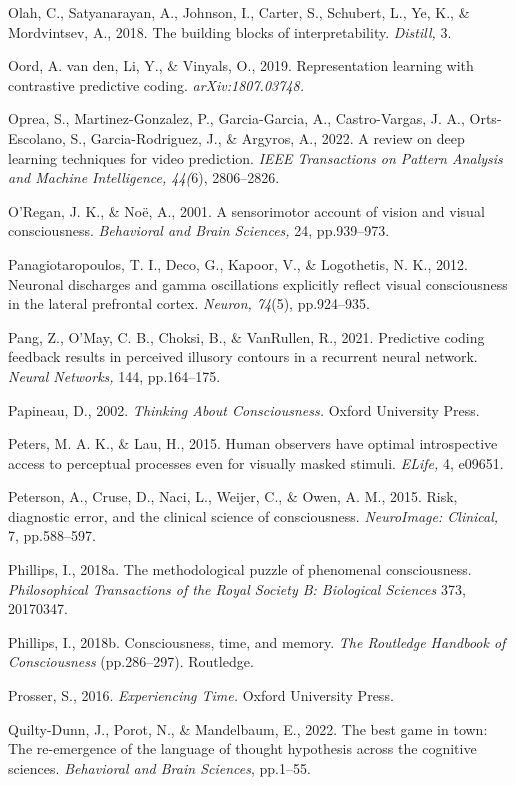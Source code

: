 \documentclass[12pt]{article}
\begin{document}
Olah, C., Satyanarayan, A., Johnson, I., Carter, S., Schubert, L., Ye,
K., \& Mordvintsev, A., 2018. The building blocks of interpretability.
\emph{Distill,} 3.

Oord, A. van den, Li, Y., \& Vinyals, O., 2019. Representation learning
with contrastive predictive coding. \emph{arXiv:1807.03748.}

Oprea, S., Martinez-Gonzalez, P., Garcia-Garcia, A., Castro-Vargas, J.
A., Orts-Escolano, S., Garcia-Rodriguez, J., \& Argyros, A., 2022. A
review on deep learning techniques for video prediction. \emph{IEEE
Transactions on Pattern Analysis and Machine Intelligence, 44(}6),
2806--2826.

O'Regan, J. K., \& Noë, A., 2001. A sensorimotor account of vision and
visual consciousness. \emph{Behavioral and Brain Sciences,} 24,
pp.939--973.

Panagiotaropoulos, T. I., Deco, G., Kapoor, V., \& Logothetis, N. K.,
2012. Neuronal discharges and gamma oscillations explicitly reflect
visual consciousness in the lateral prefrontal cortex. \emph{Neuron,
74}(5), pp.924--935.

Pang, Z., O'May, C. B., Choksi, B., \& VanRullen, R., 2021. Predictive
coding feedback results in perceived illusory contours in a recurrent
neural network. \emph{Neural Networks,} 144, pp.164--175.

Papineau, D., 2002. \emph{Thinking About Consciousness.} Oxford
University Press.

Peters, M. A. K., \& Lau, H., 2015. Human observers have optimal
introspective access to perceptual processes even for visually masked
stimuli. \emph{ELife,} 4, e09651.

Peterson, A., Cruse, D., Naci, L., Weijer, C., \& Owen, A. M., 2015.
Risk, diagnostic error, and the clinical science of consciousness.
\emph{NeuroImage: Clinical,} 7, pp.588--597.

Phillips, I., 2018a. The methodological puzzle of phenomenal
consciousness. \emph{Philosophical Transactions of the Royal Society B:
Biological Sciences} 373, 20170347.

Phillips, I., 2018b. Consciousness, time, and memory. \emph{The
Routledge Handbook of Consciousness} (pp.286--297). Routledge.

Prosser, S., 2016. \emph{Experiencing Time.} Oxford University Press.

Quilty-Dunn, J., Porot, N., \& Mandelbaum, E., 2022. The best game in
town: The re-emergence of the language of thought hypothesis across the
cognitive sciences. \emph{Behavioral and Brain Sciences}, pp.1--55.
\end{document}
